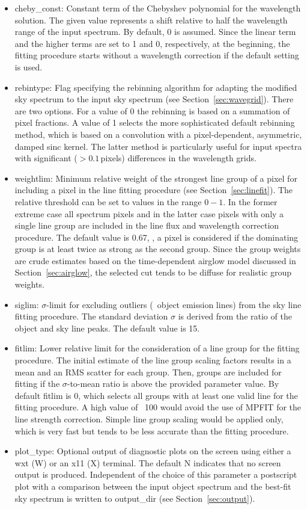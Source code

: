 \begin{itemize}
\item {\sc cheby\_const}: Constant term of the Chebyshev polynomial for the
wavelength solution. The given value represents a shift relative to half the
wavelength range of the input spectrum. By default, 0 is assumed. Since the
linear term and the higher terms are set to 1 and 0, respectively, at the
beginning, the fitting procedure starts without a wavelength correction if the
default setting is used.
\item {\sc rebintype}: Flag specifying the rebinning algorithm for adapting
the modified sky spectrum to the input sky spectrum (see
Section~\ref{sec:wavegrid}). There are two options. For a value of 0 the
rebinning is based on a summation of pixel fractions. A value of 1 selects the
more sophisticated default rebinning method, which is based on a convolution
with a pixel-dependent, asymmetric, damped sinc kernel. The latter method is
particularly useful for input spectra with significant ($> 0.1$\,pixels)
differences in the wavelength grids.
\item {\sc weightlim}: Minimum relative weight of the strongest line group of
a pixel for including a pixel in the line fitting procedure (see
Section~\ref{sec:linefit}). The relative threshold can be set to values in the
range $0 - 1$. In the former extreme case all spectrum pixels and in the latter
case pixels with only a single line group are included in the line flux and
wavelength correction procedure. The default value is 0.67, \ie, a pixel is
considered if the dominating group is at least twice as strong as the second
group. Since the group weights are crude estimates based on the time-dependent
airglow model discussed in Section~\ref{sec:airglow}, the selected cut tends to
be diffuse for realistic group weights.
\item {\sc siglim}: $\sigma$-limit for excluding outliers (\eg\ object emission
lines) from the sky line fitting procedure. The standard deviation $\sigma$ is
derived from the ratio of the object and sky line peaks. The default value is
15.
\item {\sc fitlim}: Lower relative limit for the consideration of a line group
for the fitting procedure. The initial estimate of the line group scaling
factors results in a mean and an RMS scatter for each group. Then, groups
are included for fitting if the $\sigma$-to-mean ratio is above the provided
parameter value. By default {\sc fitlim} is 0, which selects all groups with at
least one valid line for the fitting procedure. A high value of \eg\ 100 would
avoid the use of MPFIT for the line strength correction. Simple line group
scaling would be applied only, which is very fast but tends to be less accurate
than the fitting procedure.
\item {\sc plot\_type}: Optional output of diagnostic plots on the screen using
either a wxt (W) or an x11 (X) terminal. The default N indicates that no screen
output is produced. Independent of the choice of this parameter a postscript
plot with a comparison between the input object spectrum and the best-fit sky
spectrum is written to {\sc output\_dir} (see Section~\ref{sec:output}).
\end{itemize}

